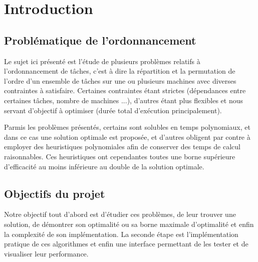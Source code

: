 \chapter{Introduction}
\section{Problématique de l'ordonnancement}
Le sujet ici présenté est l'étude de plusieurs problèmes relatifs à
l'ordonnancement de tâches, c'est à dire la répartition et la permutation de
l'ordre d'un ensemble de tâches sur une ou plusieurs machines avec diverses
contraintes à satisfaire. Certaines contraintes étant strictes (dépendances entre
certaines tâches, nombre de machines ...), d'autres étant plus flexibles et nous servant d'objectif à
optimiser (durée total d'exécution principalement).

Parmis les problèmes
présentés, certains sont solubles en temps polynomiaux, et dans ce cas une
solution optimale est proposée, et d'autres obligent par contre à employer des heuristiques polynomiales afin de conserver des temps de calcul raisonnables. Ces heuristiques ont cependantes toutes une borne supérieure d'efficacité au moins inférieure au double de la solution optimale.

\section{Objectifs du projet}
Notre objectif tout d'abord est d'étudier ces problèmes, de leur trouver une
solution, de démontrer son optimalité ou sa borne maximale d'optimalité et enfin
la complexité de son implémentation. La seconde étape est l'implémentation
pratique de ces algorithmes et enfin une interface permettant de les tester et
de visualiser leur performance.
